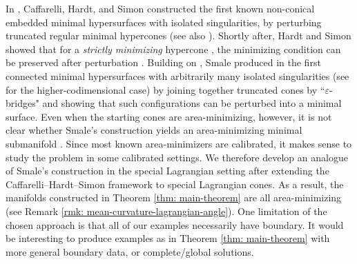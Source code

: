 \documentclass[11pt]{amsart}
\theoremstyle{definition}
\theoremstyle{remark}
\begin{document}

In \cite{CHS}, Caffarelli, Hardt, and Simon constructed the first known non-conical embedded minimal hypersurfaces with isolated singularities, by perturbing truncated regular minimal hypercones (see also \cite{Simon-singularities-extrema}). Shortly after, Hardt and Simon showed that for a \emph{strictly minimizing} hypercone \cite[Section 3]{HS85}, the minimizing condition can be preserved after perturbation \cite[Theorem 4.4]{HS85}. Building on \cite{CHS}, Smale produced in \cite{Sm89} the first connected minimal hypersurfaces with arbitrarily many isolated singularities (see \cite{Sm93} for the higher-codimensional case) by joining together truncated cones by ``$\varepsilon$-bridges" and showing that such configurations can be perturbed into a minimal surface. Even when the starting cones are area-minimizing, however, it is not clear whether Smale's construction yields an area-minimizing minimal submanifold \cite[Section 5]{Sm89}. Since most known area-minimizers are calibrated, it makes sense to study the problem in some calibrated settings. We therefore develop an analogue of Smale’s construction in the special Lagrangian setting after extending the Caffarelli--Hardt--Simon framework to special Lagrangian cones. As a result, the manifolds constructed in Theorem \ref{thm: main-theorem} are all area-minimizing (see Remark \ref{rmk: mean-curvature-lagrangian-angle}). One limitation of the chosen approach is that all of our examples necessarily have boundary. It would be interesting to produce examples as in Theorem \ref{thm: main-theorem} with more general boundary data, or complete/global solutions. \\
\end{document}
